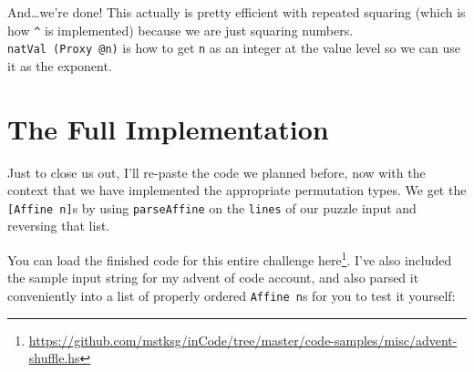 \documentclass[]{article}
\newenvironment{Shaded}{}{}
\newcommand{\CommentTok}[1]{\textcolor[rgb]{0.38,0.63,0.69}{\textit{#1}}}
\newcommand{\DataTypeTok}[1]{\textcolor[rgb]{0.56,0.13,0.00}{#1}}
\newcommand{\DecValTok}[1]{\textcolor[rgb]{0.25,0.63,0.44}{#1}}
\newcommand{\FunctionTok}[1]{\textcolor[rgb]{0.02,0.16,0.49}{#1}}
\newcommand{\KeywordTok}[1]{\textcolor[rgb]{0.00,0.44,0.13}{\textbf{#1}}}
\newcommand{\NormalTok}[1]{#1}
\newcommand{\OperatorTok}[1]{\textcolor[rgb]{0.40,0.40,0.40}{#1}}
\newcommand{\OtherTok}[1]{\textcolor[rgb]{0.00,0.44,0.13}{#1}}
\renewcommand{\href}[2]{#2\footnote{\url{#1}}}
\begin{document}
And\ldots we're done! This actually is pretty efficient with repeated squaring
(which is how \texttt{\^{}} is implemented) because we are just squaring
numbers. \texttt{natVal\ (Proxy\ @n)} is how to get \texttt{n} as an integer at
the value level so we can use it as the exponent.

\hypertarget{the-full-implementation}{%
\section{The Full Implementation}\label{the-full-implementation}}

Just to close us out, I'll re-paste the code we planned before, now with the
context that we have implemented the appropriate permutation types. We get the
\texttt{{[}Affine\ n{]}}s by using \texttt{parseAffine} on the \texttt{lines} of
our puzzle input and reversing that list.

\begin{Shaded}
\end{Shaded}

You can load the finished code for this entire challenge
\href{https://github.com/mstksg/inCode/tree/master/code-samples/misc/advent-shuffle.hs}{here}.
I've also included the sample input string for my advent of code account, and
also parsed it conveniently into a list of properly ordered \texttt{Affine\ n}s
for you to test it yourself:
\end{document}
